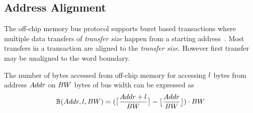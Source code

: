 \subsection{Address Alignment}
The off-chip memory bus protocol supports burst based transactions where multiple data transfers of \emph{transfer size} happen from a starting address~\cite{AxiProtocolSpec}. Most transfers in a transaction are aligned to the \emph{transfer size}. However first transfer may be unaligned to the word boundary. 

The number of bytes accessed from off-chip memory for accessing $\dataLength$ bytes from address $\addressSym$ on $\busWidth$ bytes of bus width can be expressed as
\begin{equation}\label{eq:accessfromUnalignedAddr}
	\begin{aligned}
		\numBytesOffChip(\addressSym,\dataLength,\busWidth)=(\ceil[\big]{\frac{\addressSym+\dataLength}{\busWidth}}-\floor[\big]{\frac{\addressSym}{\busWidth}})\cdot{\busWidth}
	\end{aligned}
\end{equation}
